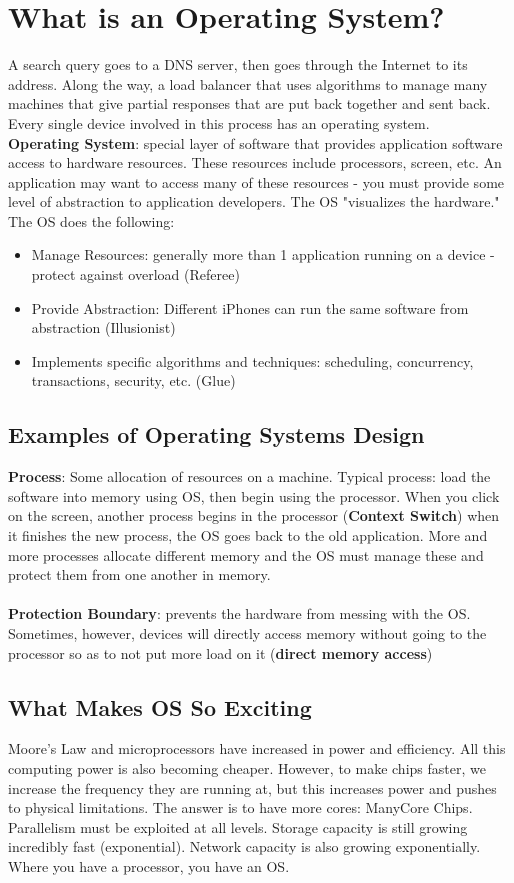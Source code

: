 \documentclass{article}
\begin{document}
\tableofcontents

\section{What is an Operating System?}
A search query goes to a DNS server, then goes through the Internet to its address. Along the way, a load balancer that uses algorithms to manage many machines that give partial responses that are put back together and sent back. Every single device involved in this process has an operating system. \\ 
\textbf{Operating System}: special layer of software that provides application software access to hardware resources. These resources include processors, screen, etc. An application may want to access many of these resources - you must provide some level of abstraction to application developers. The OS "visualizes the hardware." The OS does the following:
\begin{itemize}
\item Manage Resources: generally more than 1 application running on a device - protect against overload (Referee)
\item Provide Abstraction: Different iPhones can run the same software from abstraction (Illusionist)
\item Implements specific algorithms and techniques: scheduling, concurrency, transactions, security, etc. (Glue)
\end{itemize}
\subsection{Examples of Operating Systems Design}
\textbf{Process}: Some allocation of resources on a machine. Typical process: load the software into memory using OS, then begin using the processor. When you click on the screen, another process begins in the processor (\textbf{Context Switch}) when it finishes the new process, the OS goes back to the old application. More and more processes allocate different memory and the OS must manage these and protect them from one another in memory. \\ \\ 
\textbf{Protection Boundary}: prevents the hardware from messing with the OS. Sometimes, however, devices will directly access memory without going to the processor so as to not put more load on it (\textbf{direct memory access})
\subsection{What Makes OS So Exciting}
Moore's Law and microprocessors have increased in power and efficiency. All this computing power is also becoming cheaper. However, to make chips faster, we increase the frequency they are running at, but this increases power and pushes to physical limitations. The answer is to have more cores: ManyCore Chips. Parallelism must be exploited at all levels. Storage capacity is still growing incredibly fast (exponential). Network capacity is also growing exponentially. Where you have a processor, you have an OS.
\end{document}
